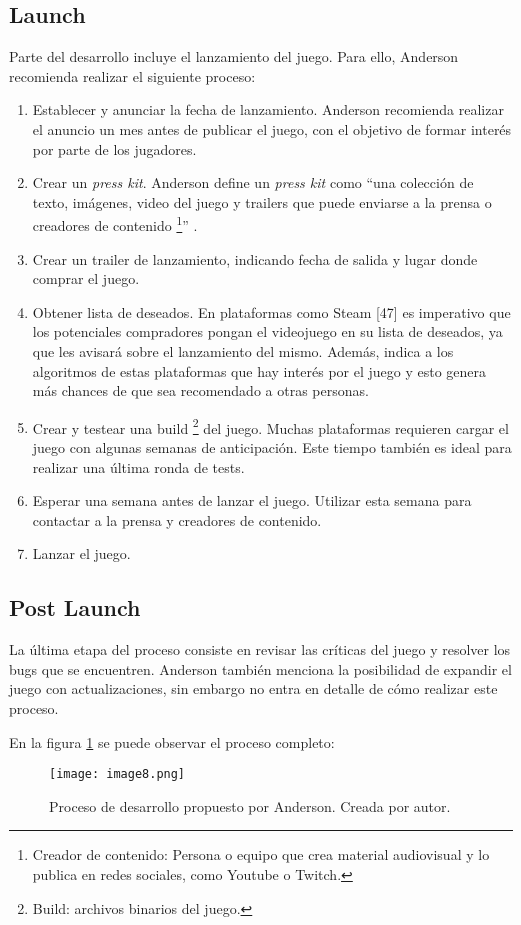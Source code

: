 \subsection{Launch}
Parte del desarrollo incluye el lanzamiento del juego. Para ello, Anderson recomienda realizar el siguiente proceso:
\begin{enumerate}
  \item Establecer y anunciar la fecha de lanzamiento. Anderson recomienda realizar el anuncio un mes antes de publicar el juego, con el objetivo de formar interés por parte de los jugadores.
  \item Crear un \textit{press kit}. Anderson define un \textit{press kit} como “una colección de texto, imágenes, video del juego y trailers que puede enviarse a la prensa o creadores de contenido \footnote{Creador de contenido: Persona o equipo que crea material audiovisual y lo publica en redes sociales, como Youtube o Twitch.}” \cite{andersonProductionPointHow2023}.
  \item Crear un trailer de lanzamiento, indicando fecha de salida y lugar donde comprar el juego.
  \item Obtener lista de deseados. En plataformas como Steam [47] es imperativo que los potenciales compradores pongan el videojuego en su lista de deseados, ya que les avisará sobre el lanzamiento del mismo. Además, indica a los algoritmos de estas plataformas que hay interés por el juego y esto genera más chances de que sea recomendado a otras personas.
  \item Crear y testear una build \footnote{Build: archivos binarios del juego.} del juego. Muchas plataformas requieren cargar el juego con algunas semanas de anticipación. Este tiempo también es ideal para realizar una última ronda de tests.
  \item Esperar una semana antes de lanzar el juego. Utilizar esta semana para contactar a la prensa y creadores de contenido.
  \item Lanzar el juego.
\end{enumerate}
%
%
\subsection{Post Launch}
\par La última etapa del proceso consiste en revisar las críticas del juego y resolver los bugs que se encuentren. Anderson también menciona la posibilidad de expandir el juego con actualizaciones, sin embargo no entra en detalle de cómo realizar este proceso.
\bigbreak
\par En la figura \ref{fig:x proceso de desarrollo Anderson} se puede observar el proceso completo:
\begin{figure}[H]
  \centering
  \texttt{[image: image8.png]}
  \caption{Proceso de desarrollo propuesto por Anderson. Creada por autor.}
  \label{fig:x proceso de desarrollo Anderson}
\end{figure}
